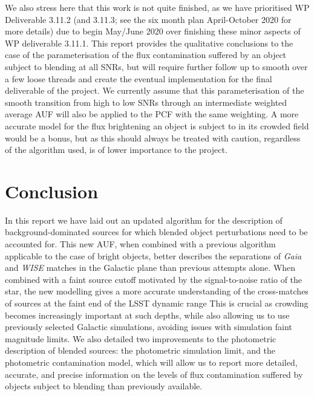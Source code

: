 \documentclass[fleqn,usenatbib]{mnras}
\begin{document}
We also stress here that this work is not quite finished, as we have prioritised WP Deliverable 3.11.2 (and 3.11.3; see the six month plan April-October 2020 for more details) due to begin May/June 2020 over finishing these minor aspects of WP deliverable 3.11.1.
This report provides the qualitative conclusions to the case of the parameterisation of the flux contamination suffered by an object subject to blending at all SNRs, but will require further follow up to smooth over a few loose threads and create the eventual implementation for the final deliverable of the project.
We currently assume that this parameterisation of the smooth transition from high to low SNRs through an intermediate weighted average AUF will also be applied to the PCF with the same weighting.
A more accurate model for the flux brightening an object is subject to in its crowded field would be a bonus, but as this should always be treated with caution, regardless of the algorithm used, is of lower importance to the project.

\section{Conclusion}
In this report we have laid out an updated algorithm for the description of background-dominated sources for which blended object perturbations need to be accounted for.
This new AUF, when combined with a previous algorithm applicable to the case of bright objects, better describes the separations of \textit{Gaia} and \textit{WISE} matches in the Galactic plane than previous attempts alone. 
When combined with a faint source cutoff motivated by the signal-to-noise ratio of the star, the new modelling gives a more accurate understanding of the cross-matches of sources at the faint end of the LSST dynamic range
This is crucial as crowding becomes increasingly important at such depths, while also allowing us to use previously selected Galactic simulations, avoiding issues with simulation faint magnitude limits.
We also detailed two improvements to the photometric description of blended sources: the photometric simulation limit, and the photometric contamination model, which will allow us to report more detailed, accurate, and precise information on the levels of flux contamination suffered by objects subject to blending than previously available.







\bsp	%
\label{lastpage}
\end{document}
